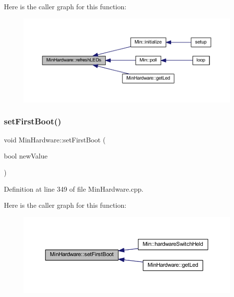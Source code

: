 Here is the caller graph for this function\+:
\nopagebreak
\begin{figure}[H]
\begin{center}
\leavevmode
\includegraphics[width=350pt]{d0/d93/class_min_hardware_a84e0d11e73681ef8b7a7e90628b827ab_icgraph}
\end{center}
\end{figure}
\mbox{\label{class_min_hardware_a84cd3aa52662d5f6e599035a812894f9}} 
\subsubsection{\texorpdfstring{set\+First\+Boot()}{setFirstBoot()}}
{\footnotesize\ttfamily void Min\+Hardware\+::set\+First\+Boot (\begin{DoxyParamCaption}\item[{bool}]{new\+Value }\end{DoxyParamCaption})}



Definition at line 349 of file Min\+Hardware.\+cpp.

Here is the caller graph for this function\+:
\nopagebreak
\begin{figure}[H]
\begin{center}
\leavevmode
\includegraphics[width=350pt]{d0/d93/class_min_hardware_a84cd3aa52662d5f6e599035a812894f9_icgraph}
\end{center}
\end{figure}
\mbox{\label{class_min_hardware_a9a29bee58534914c24171d362e78bd2a}} 
